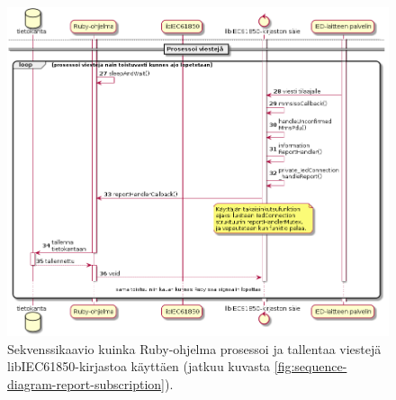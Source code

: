 \begin{figure}[ht!]
	\includegraphics[width=1\textwidth]{pictures/sequence-diagram-report-subscription_001.png}
	\caption{Sekvenssikaavio kuinka Ruby-ohjelma prosessoi ja tallentaa viestejä libIEC61850-kirjastoa käyttäen (jatkuu kuvasta \ref{fig:sequence-diagram-report-subscription}).}
	\label{fig:sequence-diagram-report-subscription-processing}
\end{figure}

